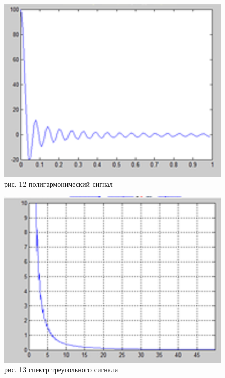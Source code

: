 \documentclass[10pt,a4paper]{report}
\begin{document}
\begin{figure}
\begin{center}
\includegraphics[angle=0, scale = 0.8]{12.png}\newline
рис. 12  полигармонический сигнал\newline
\end{center}
\end{figure}
\begin{figure}
\begin{center}
\includegraphics[angle=0, scale = 0.7]{13.png}\newline
рис. 13   спектр треугольного сигнала\newline
\end{center}
\end{figure}
\end{document}
